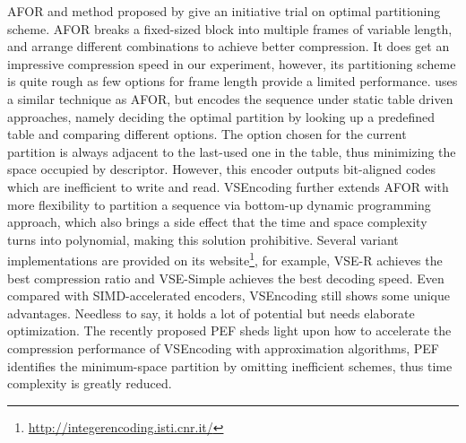 \documentclass[runningheads,a4paper]{llncs}
\begin{document}
AFOR and method proposed by \cite{anh2004index} give an initiative trial on optimal partitioning scheme.
AFOR breaks a fixed-sized block into multiple frames of variable length, and arrange different combinations to achieve better compression.
It does get an impressive compression speed in our experiment, however, its partitioning scheme is quite rough as few options for frame length provide a limited performance.
\cite{anh2004index} uses a similar technique as AFOR, but encodes the sequence under static table driven approaches, namely deciding the optimal partition by looking up a predefined table and comparing different options.
The option chosen for the current partition is always adjacent to the last-used one in the table, thus minimizing the space occupied by descriptor.
However, this encoder outputs bit-aligned codes which are inefficient to write and read.
VSEncoding further extends AFOR with more flexibility to partition a sequence via bottom-up dynamic programming approach, which also brings a side effect that the time and space complexity turns into polynomial, making this solution prohibitive.
Several variant implementations are provided on its website\footnote{\url{http://integerencoding.isti.cnr.it/}}, for example, VSE-R achieves the best compression ratio and VSE-Simple achieves the best decoding speed.
Even compared with SIMD-accelerated encoders, VSEncoding still shows some unique advantages.
Needless to say, it holds a lot of potential but needs elaborate optimization.
The recently proposed PEF sheds light upon how to accelerate the compression performance of VSEncoding with approximation algorithms, PEF identifies the minimum-space partition by omitting inefficient schemes, thus time complexity is greatly reduced.
\end{document}
